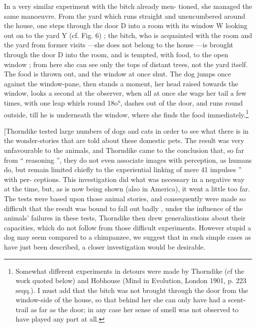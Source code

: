 \documentclass{article}
\begin{document}
In a very similar experiment
with the bitch already men-
tioned, she managed the same manoeuvre. From the yard
which runs straight and unencumbered around the house,
one steps through the door D into a room with its window
W looking out on to the yard Y (cf. Fig. 6) ; the bitch,
who is acquainted with the room and the yard from former
visits —she does not belong to the house —is brought through
the door D into the room, and is tempted, with food, to the
open window ; from here she can see only the tops of distant
trees, not the yard itself. The food is thrown out, and the
window at once shut. The dog jumps once against the
window-pane, then stands a moment, her head raised towards
the window, looks a second at the observer, when all at once
she wags her tail a few times, with one leap whirls round
18o°, dashes out of the door, and runs round outside, till
he is underneath the window, where she finds the food
immediately.\footnote{Somewhat different experiments in detours were made by Thorndike
(cf the work quoted below) and Hobhouse (Mind in Evolution, London
1901, p. 223 seqq.). I must add that the bitch was not brought through
the door from the window-side of the house, so that behind her she can
only have had a scent-trail as far as the door; in any case her sense of
smell was not observed to have played any part at all.
}

[Thorndike tested large numbers of dogs and cats in order
to see what there is in the wonder-stories that are told about
these domestic pets. The result was very unfavourable to
the animals, and Thorndike came to the conclusion that,
so far from “ reasoning ”, they do not even associate images
with perception, as humans do, but remain limited chiefly
to the experiential linking of mere 41
impulses ” with per-
ceptions. This investigation did what was necessary in a
negative way at the time, but, as is now being shown (also
in America), it went a little too far. The tests were based
upon those animal stories, and consequently were made so
difficult that the result was bound to fall out badly , under
the influence of the animals’ failures in these tests, Thorndike
then drew generalizations about their capacities, which
do not follow from those difficult experiments. However
stupid a dog may seem compared to a chimpanzee, we suggest
that in such simple cases as have just been described, a closer
investigation would be desirable.
\end{document}
